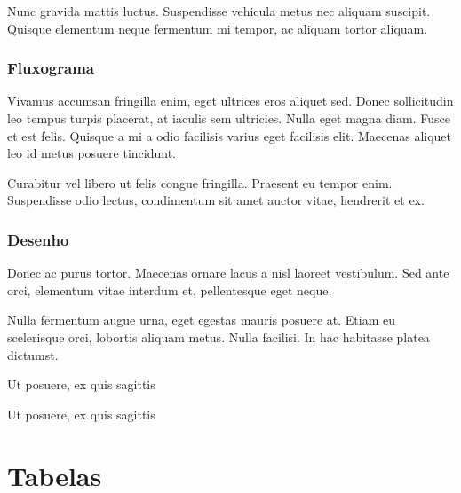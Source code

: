 \documentclass{uecetex}
\begin{document}
	
	
	Nunc gravida mattis luctus. Suspendisse vehicula metus nec aliquam suscipit. Quisque elementum neque fermentum mi tempor, ac aliquam tortor aliquam.
	
	\subsubsection{Fluxograma}
	
	Vivamus accumsan fringilla enim, eget ultrices eros aliquet sed. Donec sollicitudin leo tempus turpis placerat, at iaculis sem ultricies. Nulla eget magna diam. Fusce et est felis. Quisque a mi a odio facilisis varius eget facilisis elit. Maecenas aliquet leo id metus posuere tincidunt.
	
	

	Curabitur vel libero ut felis congue fringilla. Praesent eu tempor enim. Suspendisse odio lectus, condimentum sit amet auctor vitae, hendrerit et ex.

	\subsubsection{Desenho}
	
	Donec ac purus tortor. Maecenas ornare lacus a nisl laoreet vestibulum. Sed ante orci, elementum vitae interdum et, pellentesque eget neque.
	
	
	
	Nulla fermentum augue urna, eget egestas mauris posuere at. Etiam eu scelerisque orci, lobortis aliquam metus. Nulla facilisi. In hac habitasse platea dictumst. 
	
	

	\blindtext
	
	\begin{figura}[h!]
		\centering
		\caption{\label{des:example-1} Ut posuere, ex quis sagittis}	
	\end{figura}

\blindtext

\begin{figura}[h!]
	\centering
	\caption{\label{des:example-1} Ut posuere, ex quis sagittis}	
\end{figura}

\blindtext

\section{Tabelas}
\end{document}
